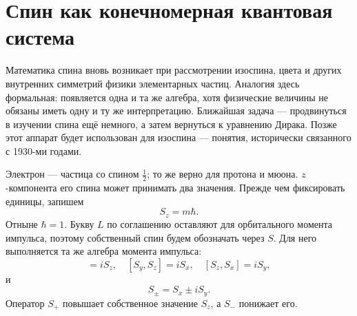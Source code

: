\begin{classroomqa}
\end{classroomqa}

\section{Спин как конечномерная квантовая система}

Математика спина вновь возникает при рассмотрении изоспина, цвета и других внутренних симметрий физики элементарных частиц. Аналогия здесь формальная: появляется одна и та же алгебра, хотя физические величины не обязаны иметь одну и ту же интерпретацию. Ближайшая задача — продвинуться в изучении спина ещё немного, а затем вернуться к уравнению Дирака. Позже этот аппарат будет использован для изоспина — понятия, исторически связанного с 1930-ми годами.

Электрон — частица со спином \(\tfrac12\); то же верно для протона и мюона. \(z\)-компонента его спина может принимать два значения. Прежде чем фиксировать единицы, запишем
\begin{equation}
S_z=m\hbar.
\end{equation}
Отныне \(\hbar=1\). Букву \(L\) по соглашению оставляют для орбитального момента импульса, поэтому собственный спин будем обозначать через \(S\). Для него выполняется та же алгебра момента импульса:
\begin{equation}
[S_x,S_y]=iS_z,
\quad
[S_y,S_z]=iS_x,
\quad
[S_z,S_x]=iS_y,
\end{equation}
и
\begin{equation}
S_\pm=S_x\pm iS_y.
\end{equation}
Оператор \(S_+\) повышает собственное значение \(S_z\), а \(S_-\) понижает его.

\begin{classroomqa}
\end{classroomqa}

